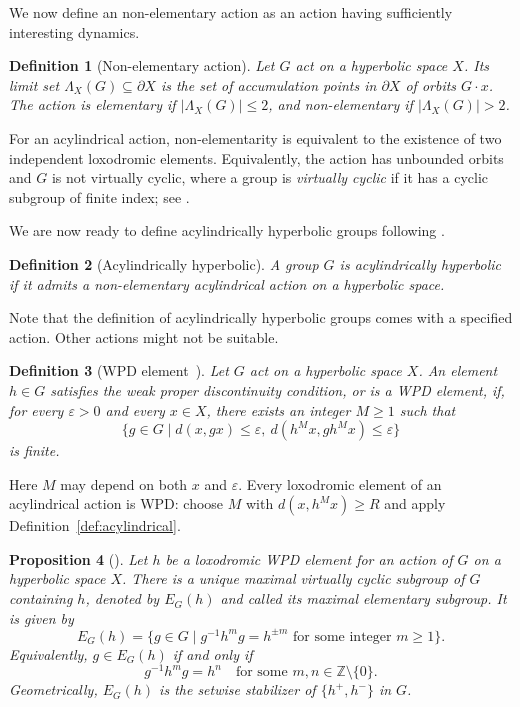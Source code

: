 \documentclass[11pt,letterpaper]{amsart}
\newtheorem{prop}{Proposition}[section]
\newtheorem{definition}[prop]{Definition}
\newcommand{\ZZ}{\mathbb{Z}}
\begin{document}
We now define an non-elementary action as an action having sufficiently interesting dynamics.
\begin{definition}[Non-elementary action]
\label{def:elementary}
Let $G$ act on a hyperbolic space $X$.  Its \emph{limit set}
$\Lambda_X(G)\subseteq\partial X$ is the set of accumulation points in
$\partial X$ of orbits $G \cdot x$.
The action is \emph{elementary} if $|\Lambda_X(G)|\leq2$, and
\emph{non-elementary} if $|\Lambda_X(G)|>2$.
\end{definition}

For an acylindrical action, non-elementarity is equivalent to the existence
of two independent loxodromic elements.  Equivalently, the action has
unbounded orbits and $G$ is not virtually cyclic, where a group is
\emph{virtually cyclic} if it has a cyclic subgroup of finite index;
see \cite[Theorem~1.1]{OsinAcylindrical}. 

We are now ready to define acylindrically hyperbolic groups following \cite[Definition~1.3]{OsinAcylindrical}.
\begin{definition}[Acylindrically hyperbolic]
\label{def:AH}
A group $G$ is \emph{acylindrically hyperbolic} if it admits a
non-elementary acylindrical action on a hyperbolic space.
\end{definition}

Note that the definition of acylindrically hyperbolic groups comes with a specified action. Other actions might not be suitable.

\begin{definition}[WPD element~{\cite[Definition~6.1]{DGO}}]
\label{def:WPD}
Let $G$ act on a hyperbolic space $X$.  An element $h\in G$ satisfies the
\emph{weak proper discontinuity condition}, or is a \emph{WPD element},
if, for every $\varepsilon>0$ and every $x\in X$, there exists an integer
$M\geq1$ such that
\[
    \{g\in G\mid d(x,gx)\leq\varepsilon,
                  \ d(h^M x,gh^M x)\leq\varepsilon\}
\]
is finite.
\end{definition}

Here $M$ may depend on both $x$ and $\varepsilon$.  Every loxodromic element
of an acylindrical action is WPD: choose $M$ with $d(x,h^M x)\geq R$ and
apply Definition~\ref{def:acylindrical}. 

\begin{prop}[{\cite[Lemma~6.5 and Corollary~6.6]{DGO}}]
\label{prop:EG}
Let $h$ be a loxodromic WPD element for an action of $G$ on a hyperbolic
space $X$.  There is a unique maximal virtually cyclic subgroup of $G$
containing $h$, denoted by $E_G(h)$ and called its \emph{maximal elementary
subgroup}.  It is given by
\[
    E_G(h)=\{g\in G\mid
       g^{-1}h^m g=h^{\pm m}\text{ for some integer }m\geq1\}.
\]
Equivalently, $g\in E_G(h)$ if and only if
\[
    g^{-1}h^m g=h^n
    \quad\text{for some }m,n\in\ZZ\setminus\{0\}.
\]
Geometrically, $E_G(h)$ is the setwise stabilizer of
$\{h^+,h^-\}$ in $G$.
\end{prop}
\end{document}
